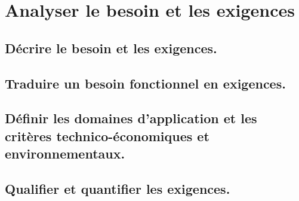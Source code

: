 \documentclass[10pt,fleqn]{article}
\newcommand{\repRel}{../..}
\newcommand{\repStyle}{\repRel/Style}
\begin{document}
\def\xxcompetences{}
\def\xxfigures{}
\graphicspath{{\repStyle/png/}}
\setlength{\columnseprule}{.1pt}

\def\xxpartie{}
\def\xxnumpartie{}
\def\xxchapitre{xxch}
\def\xxnumchapitre{}
\def\xxactivite{DDS 3}
\def\xxtitreexo{Les ptits devoirs du soir}
\def\xxsourceexo{Xavier Pessoles}
\newpage
\def\xxchapitre{Analyser}
\def\xxactivite{A}
\setcounter{section}{0}
\setcounter{numexo}{0}


\section{Analyser le besoin et les exigences} 

\subsection{Décrire le besoin et les exigences.} 

\begin{multicols}{2} 

\end{multicols}

\subsection{Traduire un besoin fonctionnel en exigences.} 

\begin{multicols}{2} 

\end{multicols}

\subsection{Définir les domaines d’application et les critères technico-économiques et environnementaux.} 

\begin{multicols}{2} 

\end{multicols}

\subsection{Qualifier et quantifier les exigences.} 

\begin{multicols}{2} 

\end{multicols}
\end{document}
